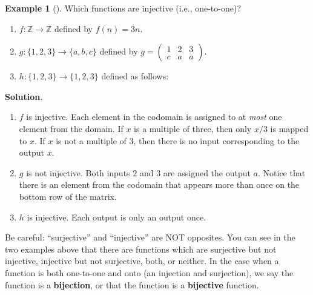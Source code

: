 \documentclass[10pt,]{book}
\newcommand{\terminology}[1]{\textbf{#1}}
\theoremstyle{plain}
\theoremstyle{definition}
\theoremstyle{definition}
\newtheorem{example}[theorem]{Example}
\theoremstyle{definition}
\theoremstyle{definition}
\numberwithin{equation}{chapter}
\def\Z{\mathbb Z}
\newcommand{\amp}{&}
\begin{document}
\begin{example}[]\label{example-51}
\hypertarget{p-1639}{}%
Which functions are injective (i.e., one-to-one)?%
\par
\hypertarget{p-1640}{}%
\leavevmode%
\begin{enumerate}
\item\hypertarget{li-543}{}\(f:\Z \to \Z\) defined by \(f(n) = 3n\).%
\item\hypertarget{li-544}{}\(g: \{1,2,3\} \to \{a,b,c\}\) defined by \(g = \begin{pmatrix}1 \amp 2 \amp 3 \\ c \amp a \amp a \end{pmatrix}\).%
\item\hypertarget{li-545}{}\hypertarget{p-1641}{}%
\(h:\{1,2,3\} \to \{1,2,3\}\) defined as follows:%
\begin{sidebyside}{1}{0.4}{0.4}{0}
\begin{sbspanel}{0.2}
\end{sbspanel}
\end{sidebyside}
\end{enumerate}
%
\par\smallskip%
\noindent\textbf{Solution}.\hypertarget{solution-144}{}\quad%
\hypertarget{p-1642}{}%
\leavevmode%
\begin{enumerate}
\item\hypertarget{li-546}{}\(f\) is injective. Each element in the codomain is assigned to at \emph{most} one element from the domain. If \(x\) is a multiple of three, then only \(x/3\) is mapped to \(x\). If \(x\) is not a multiple of 3, then there is no input corresponding to the output \(x\).%
\item\hypertarget{li-547}{}\(g\) is not injective. Both inputs \(2\) and \(3\) are assigned the output \(a\). Notice that there is an element from the codomain that appears more than once on the bottom row of the matrix.%
\item\hypertarget{li-548}{}\(h\) is injective. Each output is only an output once.%
\end{enumerate}
%
\end{example}
\hypertarget{p-1643}{}%
Be careful: ``surjective'' and ``injective'' are NOT opposites.  You can see in the two examples above that there are functions which are surjective but not injective, injective but not surjective, both, or neither. In the case when a function is both one-to-one and onto (an injection and surjection), we say the function is a \terminology{bijection}, or that the function is a \terminology{bijective} function.%
\end{document}
